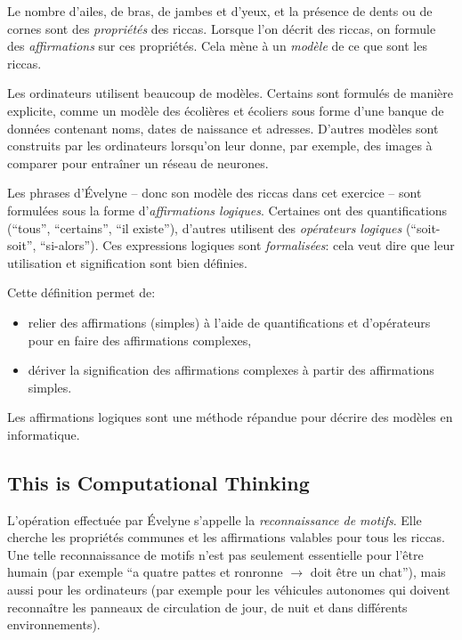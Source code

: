 \documentclass[a4paper,11pt]{report}
\begin{document}
Le nombre d’ailes, de bras, de jambes et d’yeux, et la présence de dents ou de cornes sont des \emph{propriétés} des riccas. Lorsque l’on décrit des riccas, on formule des \emph{affirmations} sur ces propriétés. Cela mène à un \emph{modèle} de ce que sont les riccas.

Les ordinateurs utilisent beaucoup de modèles. Certains sont formulés de manière explicite, comme un modèle des écolières et écoliers sous forme d’une banque de données contenant noms, dates de naissance et adresses. D’autres modèles sont construits par les ordinateurs lorsqu’on leur donne, par exemple, des images à comparer pour entraîner un réseau de neurones.

Les phrases d’Évelyne – donc son modèle des riccas dans cet exercice – sont formulées sous la forme d’\emph{affirmations logiques}. Certaines ont des quantifications (“tous”, “certains”, “il existe”), d’autres utilisent des \emph{opérateurs logiques} (“soit-soit”, “si-alors”). Ces expressions logiques sont \emph{formalisées}: cela veut dire que leur utilisation et signification sont bien définies.

\begin{samepage}
Cette définition permet de:

\nopagebreak

\begin{itemize}
  \item relier des affirmations (simples) à l’aide de quantifications et d’opérateurs pour en faire des affirmations complexes,
  \item dériver la signification des affirmations complexes à partir des affirmations simples.
\end{itemize}


\end{samepage}

Les affirmations logiques sont une méthode répandue pour décrire des modèles en informatique.


\subsection*{This is Computational Thinking}

L’opération effectuée par Évelyne s’appelle la \emph{reconnaissance de motifs}. Elle cherche les propriétés communes et les affirmations valables pour tous les riccas. Une telle reconnaissance de motifs n’est pas seulement essentielle pour l’être humain (par exemple “a quatre pattes et ronronne \ensuremath{\rightarrow} doit être un chat”), mais aussi pour les ordinateurs (par exemple pour les véhicules autonomes qui doivent reconnaître les panneaux de circulation de jour, de nuit et dans différents environnements).
\end{document}
